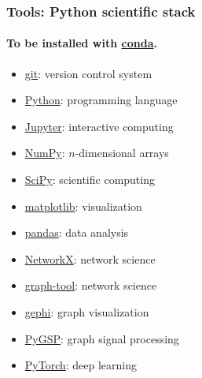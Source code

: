 \documentclass[aspectratio=169]{beamer}
\begin{document}
\begin{frame}
	\frametitle{Tools: Python scientific stack}
	\framesubtitle{To be installed with \href{https://conda.io}{conda}.}
	\begin{minipage}{0.45\linewidth}
	\begin{itemize}
		\item \href{https://git-scm.com}{git}: version control system
		\vspace{0.7em}
		\item \href{https://www.python.org}{Python}: programming language
		\vspace{0.7em}
		\item \href{https://jupyter.org}{Jupyter}: interactive computing
		\vspace{0.7em}
		\item \href{http://www.numpy.org}{NumPy}: $n$-dimensional arrays
		\vspace{0.7em}
		\item \href{https://www.scipy.org/scipylib}{SciPy}: scientific computing
		\vspace{0.7em}
		\item \href{https://matplotlib.org}{matplotlib}: visualization
	\end{itemize}
	\end{minipage}
	\hfill
	\begin{minipage}{0.45\linewidth}
	\begin{itemize}
		\item \href{https://pandas.pydata.org}{pandas}: data analysis
		\vspace{0.7em}
		\item \href{https://networkx.github.io}{NetworkX}: network science
		\vspace{0.7em}
		\item \href{https://graph-tool.skewed.de}{graph-tool}: network science
		\vspace{0.7em}
		\item \href{https://pytorch.org}{gephi}: graph visualization
		\vspace{0.7em}
		\item \href{https://github.com/epfl-lts2/pygsp}{PyGSP}: graph signal processing
		\vspace{0.7em}
		\item \href{https://pytorch.org}{PyTorch}: deep learning
	\end{itemize}
	\end{minipage}
\end{frame}
\end{document}
